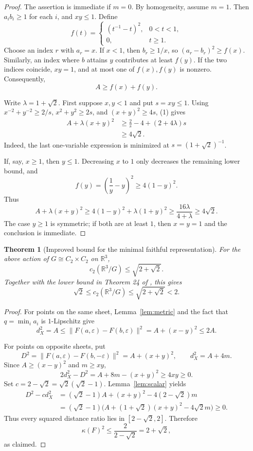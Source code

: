\documentclass[11pt]{article}
\newtheorem{theorem}{Theorem}
\newcommand{\R}{\mathbb R}
\newcommand{\Vfour}{C_2\times C_2}
\begin{document}
\begin{proof}
The assertion is immediate if $m=0$. By homogeneity, assume $m=1$. Then
$a_i b_i\geq1$ for each $i$, and $xy\leq1$. Define
\[
 f(t)=\begin{cases}(t^{-1}-t)^2,&0<t<1,\\0,&t\geq1.\end{cases}
\]
Choose an index $r$ with $a_r=x$. If $x<1$, then $b_r\geq1/x$, so
$(a_r-b_r)^2\geq f(x)$. Similarly, an index where $b$ attains $y$ contributes
at least $f(y)$. If the two indices coincide, $xy=1$, and at most one of
$f(x),f(y)$ is nonzero. Consequently,
\[
A\geq f(x)+f(y).\tag{1}
\]

Write $\lambda=1+\sqrt2$. First suppose $x,y<1$ and put $s=xy\leq1$.
Using $x^{-2}+y^{-2}\geq2/s$, $x^2+y^2\geq2s$, and
$(x+y)^2\geq4s$, (1) gives
\begin{align*}
A+\lambda(x+y)^2
&\geq \frac2s-4+(2+4\lambda)s\\
&\geq4\sqrt2.
\end{align*}
Indeed, the last one-variable expression is minimized at
$s=(1+\sqrt2)^{-1}$.

If, say, $x\geq1$, then $y\leq1$. Decreasing $x$ to $1$ only decreases the
remaining lower bound, and
\[
f(y)=\left(\frac1y-y\right)^2\geq4(1-y)^2.
\]
Thus
\[
A+\lambda(x+y)^2
\geq4(1-y)^2+\lambda(1+y)^2
\geq\frac{16\lambda}{4+\lambda}\geq4\sqrt2.
\]
The case $y\geq1$ is symmetric; if both are at least $1$, then $x=y=1$ and
the conclusion is immediate.
\end{proof}

\begin{theorem}[Improved bound for the minimal faithful representation]
\label{thm:main}
For the above action of $G\cong\Vfour$ on $\R^3$,
\[
 c_2(\R^3/G)\leq\sqrt{2+\sqrt2}.
\]
Together with the lower bound in Theorem 24 of \cite{BDMQV}, this gives
\[
 \sqrt2\leq c_2(\R^3/G)\leq\sqrt{2+\sqrt2}<2.
\]
\end{theorem}

\begin{proof}
For points on the same sheet, Lemma~\ref{lem:metric} and the fact that
$q=\min_i a_i$ is $1$-Lipschitz give
\[
d_X^2=A\leq\|F(a,\varepsilon)-F(b,\varepsilon)\|^2
=A+(x-y)^2\leq2A.
\]

For points on opposite sheets, put
\[
D^2=\|F(a,\varepsilon)-F(b,-\varepsilon)\|^2=A+(x+y)^2,
\qquad d_X^2=A+4m.
\]
Since $A\geq(x-y)^2$ and $m\geq xy$,
\[
2d_X^2-D^2=A+8m-(x+y)^2\geq4xy\geq0.
\]
Set $c=2-\sqrt2=\sqrt2(\sqrt2-1)$. Lemma~\ref{lem:scalar} yields
\begin{align*}
D^2-cd_X^2
&=(\sqrt2-1)A+(x+y)^2-4(2-\sqrt2)m\\
&=(\sqrt2-1)\big(A+(1+\sqrt2)(x+y)^2-4\sqrt2 m\big)\geq0.
\end{align*}
Thus every squared distance ratio lies in $[2-\sqrt2,2]$. Therefore
\[
\kappa(F)^2\leq\frac{2}{2-\sqrt2}=2+\sqrt2,
\]
as claimed.
\end{proof}
\end{document}
